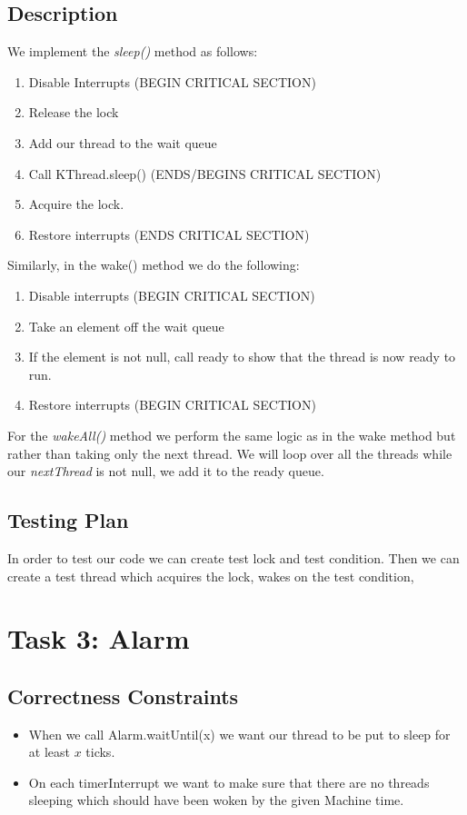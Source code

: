 \documentclass{article}
\begin{document}
\subsection*{Description}
We implement the \textit{sleep()} method as follows:
\begin{enumerate}
\item Disable Interrupts (BEGIN CRITICAL SECTION) 
\item Release the lock 
\item Add our thread to the wait queue 
\item Call KThread.sleep() (ENDS/BEGINS CRITICAL SECTION)
\item Acquire the lock.
\item Restore interrupts (ENDS CRITICAL SECTION) 
\end{enumerate}

Similarly, in the wake() method we do the following: 
\begin{enumerate}
\item Disable interrupts (BEGIN CRITICAL SECTION) 
\item Take an element off the wait queue
\item If the element is not null, call ready to show that the thread is now ready to run.
\item Restore interrupts (BEGIN CRITICAL SECTION)
\end{enumerate}

For the \textit{wakeAll()} method we perform the same logic as in the wake method but rather than taking only
the next thread. We will loop over all the threads while our \textit{nextThread} is not null, we add it to the ready
queue.

\subsection*{Testing Plan}

In order to test our code we can create test lock and test condition. Then we can create a test thread which
acquires the lock, wakes on the test condition, 

\section*{Task 3: Alarm}

\subsection*{Correctness Constraints}
\begin{itemize}
\item When we call Alarm.waitUntil(x) we want our thread to be put to sleep for at least $x$ ticks.
\item On each timerInterrupt we want to make sure that there are no threads sleeping which should have been woken by
the given Machine time.
\end{itemize}
\end{document}
